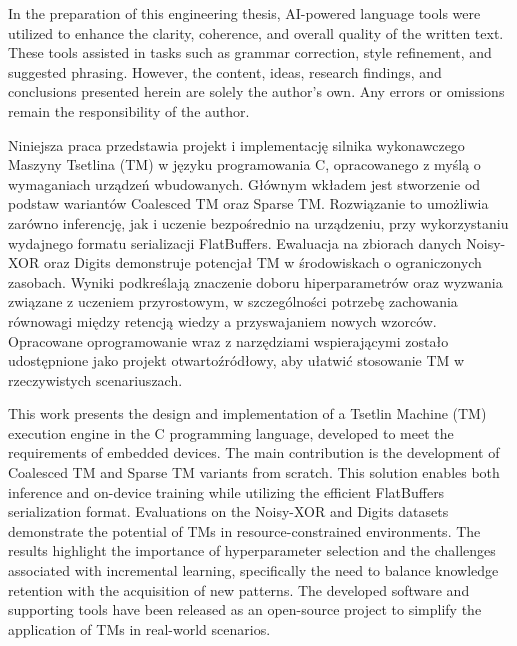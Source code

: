 \documentclass[english]{agh-wi} %
\author{Robert Mesek, Igor Sikora}
\begin{document}
\frontmatter %
\maketitle %
\cleardoublepage
\thispagestyle{empty}
\vspace*{\fill}
\begin{flushright}
    \em
    \begin{minipage}{0.75\textwidth}
        In the preparation of this engineering thesis, AI-powered language tools were utilized to enhance the clarity, coherence, and overall quality of the written text. These tools assisted in tasks such as grammar correction, style refinement, and suggested phrasing. However, the content, ideas, research findings, and conclusions presented herein are solely the author's own. Any errors or omissions remain the responsibility of the author.
    \end{minipage}
\end{flushright}
\begin{abstractPL}
\begin{otherlanguage}{polish}
    Niniejsza praca przedstawia projekt i implementację silnika wykonawczego Maszyny Tsetlina (TM) w języku programowania C, opracowanego z myślą o wymaganiach urządzeń wbudowanych. Głównym wkładem jest stworzenie od podstaw wariantów Coalesced TM oraz Sparse TM. Rozwiązanie to umożliwia zarówno inferencję, jak i uczenie bezpośrednio na urządzeniu, przy wykorzystaniu wydajnego formatu serializacji FlatBuffers. Ewaluacja na zbiorach danych Noisy-XOR oraz Digits demonstruje potencjał TM w środowiskach o ograniczonych zasobach. Wyniki podkreślają znaczenie doboru hiperparametrów oraz wyzwania związane z uczeniem przyrostowym, w szczególności potrzebę zachowania równowagi między retencją wiedzy a przyswajaniem nowych wzorców. Opracowane oprogramowanie wraz z narzędziami wspierającymi zostało udostępnione jako projekt otwartoźródłowy, aby ułatwić stosowanie TM w rzeczywistych scenariuszach.
\end{otherlanguage}
\end{abstractPL}
\begin{abstractEN}
    This work presents the design and implementation of a Tsetlin Machine (TM) execution engine in the C programming language, developed to meet the requirements of embedded devices. The main contribution is the development of Coalesced TM and Sparse TM variants from scratch. This solution enables both inference and on-device training while utilizing the efficient FlatBuffers serialization format. Evaluations on the Noisy-XOR and Digits datasets demonstrate the potential of TMs in resource-constrained environments. The results highlight the importance of hyperparameter selection and the challenges associated with incremental learning, specifically the need to balance knowledge retention with the acquisition of new patterns. The developed software and supporting tools have been released as an open-source project to simplify the application of TMs in real-world scenarios.
\end{abstractEN}
\end{document}
